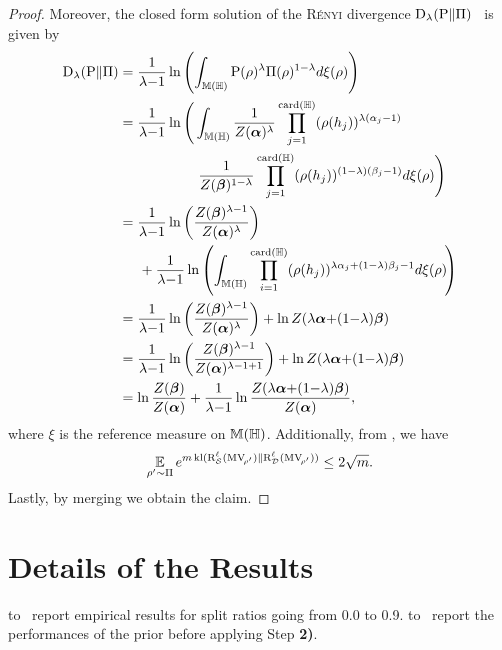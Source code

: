 \begin{noaddcontents}
\begin{proof}
Moreover, the closed form solution of the \textsc{Rényi} divergence $\operatorname{D}_{\lambda}(\mathrm{P}\|\Pi)$~\citep{GilAlajajiLinder2013} is given by
\begin{align}
    \operatorname{D}_{\lambda}(\mathrm{P}\|\Pi) &= \frac{1}{\lambda{-}1}\ln\left(\int_{\mathbb{M}(\mathbb{H})}\mathrm{P}(\rho)^\lambda\Pi(\rho)^{1-\lambda}d\xi(\rho)\right)\nonumber\\
    &= \frac{1}{\lambda{-}1}\ln\Bigg(\int_{\mathbb{M}(\mathbb{H})}\frac{1}{Z(\boldsymbol{\alpha})^\lambda}\prod_{j=1}^{\operatorname{card}(\mathbb{H})}(\rho(h_j))^{\lambda(\alpha_j-1)}\nonumber\\
    &\hspace{2cm}\frac{1}{Z(\boldsymbol{\beta})^{1-\lambda}}\prod_{j=1}^{\operatorname{card}(\mathbb{H})}(\rho(h_j))^{(1-\lambda)(\beta_j-1)} d\xi(\rho)\Bigg)\nonumber\\
    &= \frac{1}{\lambda{-}1}\ln\left( \frac{Z(\boldsymbol{\beta})^{\lambda-1}}{Z(\boldsymbol{\alpha})^{\lambda}}\right)\nonumber\\
    &\hspace{0.5cm}+ \frac{1}{\lambda{-}1}\ln\left(\int_{\mathbb{M}(\mathbb{H})}\prod_{i=1}^{\operatorname{card}(\mathbb{H})} (\rho(h_j))^{\lambda\alpha_j + (1-\lambda)\beta_j-1} d\xi(\rho)\!\right)\nonumber\\
    &= \frac{1}{\lambda{-}1}\ln\left( \frac{Z(\boldsymbol{\beta})^{\lambda-1}}{Z(\boldsymbol{\alpha})^{\lambda}}\right) + \ln Z(\lambda\boldsymbol{\alpha}{+}(1{-}\lambda)\boldsymbol{\beta})\nonumber\\
    &= \frac{1}{\lambda{-}1}\ln\left( \frac{Z(\boldsymbol{\beta})^{\lambda-1}}{Z(\boldsymbol{\alpha})^{\lambda-1+1}}\right) + \ln Z(\lambda\boldsymbol{\alpha}{+}(1{-}\lambda)\boldsymbol{\beta})\nonumber\\
    &= \ln\frac{Z(\boldsymbol{\beta})}{Z(\boldsymbol{\alpha})} + \frac{1}{\lambda{-}1}\ln\frac{Z(\lambda\boldsymbol{\alpha}{+}(1{-}\lambda)\boldsymbol{\beta})}{Z(\boldsymbol{\alpha})},\label{ap:dis-pra:eq:proof-disintegrated-mv-2}
\end{align}
where $\xi$ is the reference measure on $\mathbb{M}(\mathbb{H})$.
Additionally, from , we have 
\begin{align}
    \operatorname*{\mathbb{E}}_{\rho'\sim\Pi}e^{m\operatorname{kl}(\text{R}^{\ell}_{\mathcal{S}}(\text{MV}_{\!\rho'})\|\text{R}^{\ell}_{\mathcal{D}}(\text{MV}_{\!\rho'}))} \le 2\sqrt{m}.\label{ap:dis-pra:eq:proof-disintegrated-mv-3}
\end{align}
Lastly, by merging  we obtain the claim.
\end{proof}

\section{Details of the Results}
 to~ report empirical results for split ratios going from 0.0 to 0.9.
 to~ report the performances of the prior before applying Step {\bf 2)}. 
\\


\end{noaddcontents}
